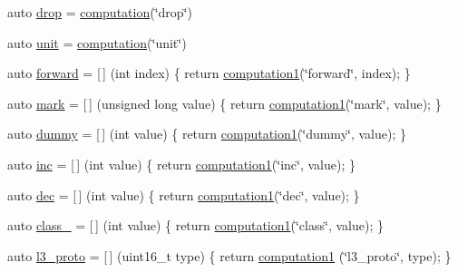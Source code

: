 \begin{DoxyCompactItemize}
\item 
auto \hyperlink{namespacepfq__lang_1_1anonymous__namespace_02default_8hpp_03_abed0412f2864624f755594077d255b1e}{drop} = \hyperlink{namespacepfq__lang_ac0c16097c968653e72c609890dfb4c44}{computation}(\char`\"{}drop\char`\"{})
\item 
auto \hyperlink{namespacepfq__lang_1_1anonymous__namespace_02default_8hpp_03_ae78caafebdc64f9180032a049b7c3b3a}{unit} = \hyperlink{namespacepfq__lang_ac0c16097c968653e72c609890dfb4c44}{computation}(\char`\"{}unit\char`\"{})
\item 
auto \hyperlink{namespacepfq__lang_1_1anonymous__namespace_02default_8hpp_03_a7fbe4b2614dd240727bf1696b4d06523}{forward} = \mbox{[}$\,$\mbox{]} (int index) \{ return \hyperlink{namespacepfq__lang_a58e7e358fc7c95121f74d56c094b1627}{computation1}(\char`\"{}forward\char`\"{}, index); \}
\item 
auto \hyperlink{namespacepfq__lang_1_1anonymous__namespace_02default_8hpp_03_ad6142fe3a0fc859f25ea16956f52a5f0}{mark} = \mbox{[}$\,$\mbox{]} (unsigned long value) \{ return \hyperlink{namespacepfq__lang_a58e7e358fc7c95121f74d56c094b1627}{computation1}(\char`\"{}mark\char`\"{}, value); \}
\item 
auto \hyperlink{namespacepfq__lang_1_1anonymous__namespace_02default_8hpp_03_a876b4be1c6cf97e317f74242d8fb3da4}{dummy} = \mbox{[}$\,$\mbox{]} (int value) \{ return \hyperlink{namespacepfq__lang_a58e7e358fc7c95121f74d56c094b1627}{computation1}(\char`\"{}dummy\char`\"{}, value); \}
\item 
auto \hyperlink{namespacepfq__lang_1_1anonymous__namespace_02default_8hpp_03_a14246183085ec07f08ab9b0d53907ae5}{inc} = \mbox{[}$\,$\mbox{]} (int value) \{ return \hyperlink{namespacepfq__lang_a58e7e358fc7c95121f74d56c094b1627}{computation1}(\char`\"{}inc\char`\"{}, value); \}
\item 
auto \hyperlink{namespacepfq__lang_1_1anonymous__namespace_02default_8hpp_03_a6e71e558e459e950a4e9beeaaaf12cf6}{dec} = \mbox{[}$\,$\mbox{]} (int value) \{ return \hyperlink{namespacepfq__lang_a58e7e358fc7c95121f74d56c094b1627}{computation1}(\char`\"{}dec\char`\"{}, value); \}
\item 
auto \hyperlink{namespacepfq__lang_1_1anonymous__namespace_02default_8hpp_03_a27a683ef93570a66844e1a0106e6336a}{class\-\_\-} = \mbox{[}$\,$\mbox{]} (int value) \{ return \hyperlink{namespacepfq__lang_a58e7e358fc7c95121f74d56c094b1627}{computation1}(\char`\"{}class\char`\"{}, value); \}
\item 
auto \hyperlink{namespacepfq__lang_1_1anonymous__namespace_02default_8hpp_03_aed01dd5380a873d92397ec0d4c07abac}{l3\-\_\-proto} = \mbox{[}$\,$\mbox{]} (uint16\-\_\-t type) \{ return \hyperlink{namespacepfq__lang_a58e7e358fc7c95121f74d56c094b1627}{computation1} (\char`\"{}l3\-\_\-proto\char`\"{}, type); \}

\end{DoxyCompactItemize}
